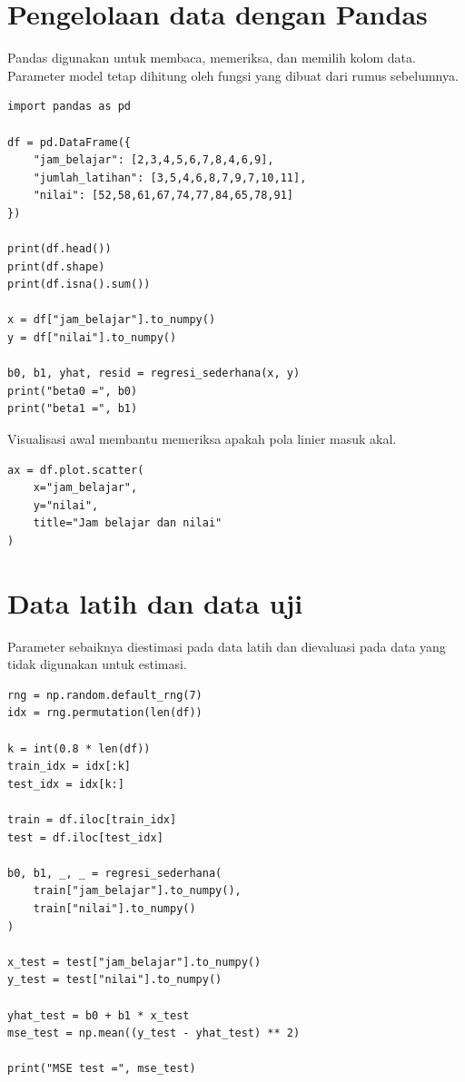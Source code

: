 \documentclass[11pt,a4paper]{report}
\begin{document}
\section{Pengelolaan data dengan Pandas}
Pandas digunakan untuk membaca, memeriksa, dan memilih kolom data. Parameter model tetap dihitung oleh fungsi yang dibuat dari rumus sebelumnya.
\begin{lstlisting}
import pandas as pd

df = pd.DataFrame({
    "jam_belajar": [2,3,4,5,6,7,8,4,6,9],
    "jumlah_latihan": [3,5,4,6,8,7,9,7,10,11],
    "nilai": [52,58,61,67,74,77,84,65,78,91]
})

print(df.head())
print(df.shape)
print(df.isna().sum())

x = df["jam_belajar"].to_numpy()
y = df["nilai"].to_numpy()

b0, b1, yhat, resid = regresi_sederhana(x, y)
print("beta0 =", b0)
print("beta1 =", b1)
\end{lstlisting}

Visualisasi awal membantu memeriksa apakah pola linier masuk akal.
\begin{lstlisting}
ax = df.plot.scatter(
    x="jam_belajar",
    y="nilai",
    title="Jam belajar dan nilai"
)
\end{lstlisting}

\section{Data latih dan data uji}
Parameter sebaiknya diestimasi pada data latih dan dievaluasi pada data yang tidak digunakan untuk estimasi.
\begin{lstlisting}
rng = np.random.default_rng(7)
idx = rng.permutation(len(df))

k = int(0.8 * len(df))
train_idx = idx[:k]
test_idx = idx[k:]

train = df.iloc[train_idx]
test = df.iloc[test_idx]

b0, b1, _, _ = regresi_sederhana(
    train["jam_belajar"].to_numpy(),
    train["nilai"].to_numpy()
)

x_test = test["jam_belajar"].to_numpy()
y_test = test["nilai"].to_numpy()

yhat_test = b0 + b1 * x_test
mse_test = np.mean((y_test - yhat_test) ** 2)

print("MSE test =", mse_test)
\end{lstlisting}
\end{document}
